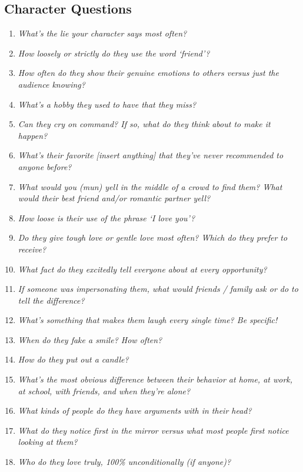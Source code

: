   \subsection{Character Questions}
  \begin{enumerate}
    \item\textit{What’s the lie your character says most often?}
    \item\textit{How loosely or strictly do they use the word ‘friend’?}
    \item\textit{How often do they show their genuine emotions to others versus just the audience knowing?}
    \item\textit{What’s a hobby they used to have that they miss?}
    \item\textit{Can they cry on command? If so, what do they think about to make it happen?}
    \item\textit{What’s their favorite [insert anything] that they’ve never recommended to anyone before?}
    \item\textit{What would you (mun) yell in the middle of a crowd to find them? What would their best friend and/or romantic partner yell?}
    \item\textit{How loose is their use of the phrase ‘I love you’?}
    \item\textit{Do they give tough love or gentle love most often? Which do they prefer to receive?}
    \item\textit{What fact do they excitedly tell everyone about at every opportunity?}
    \item\textit{If someone was impersonating them, what would friends / family ask or do to tell the difference?}
    \item\textit{What’s something that makes them laugh every single time? Be specific!}
    \item\textit{When do they fake a smile? How often?}
    \item\textit{How do they put out a candle?}
    \item\textit{What’s the most obvious difference between their behavior at home, at work, at school, with friends, and when they’re alone?}
    \item\textit{What kinds of people do they have arguments with in their head?}
    \item\textit{What do they notice first in the mirror versus what most people first notice looking at them?}
    \item\textit{Who do they love truly, 100\% unconditionally (if anyone)?}

\end{enumerate}
